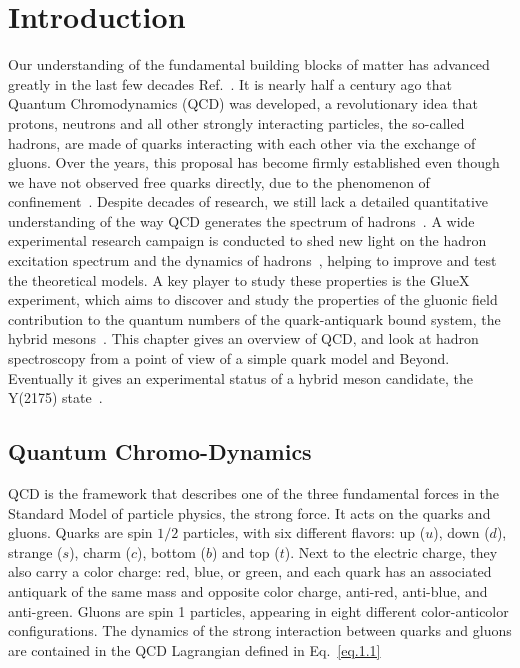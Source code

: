 \chapter{Introduction}
\label{p.1}

Our understanding of the fundamental building blocks of matter has advanced greatly in the last few decades Ref.~\cite{Fritzsch94,Gell64,Gell62,Neeman61,Zweig64}. It is nearly half a century ago that Quantum Chromodynamics (QCD) was developed, a revolutionary idea that protons, neutrons and all other strongly interacting particles, the so-called hadrons, are made of quarks interacting with each other via the exchange of gluons. Over the years, this proposal has become firmly established even though we have not observed free quarks directly, due to the phenomenon of confinement~\cite{Gross05}. Despite decades of research, we still lack a detailed quantitative understanding of the way QCD generates the spectrum of hadrons~\cite{Wilczek05}. A wide experimental research campaign is conducted to shed new light on the hadron excitation spectrum and the dynamics of hadrons~\cite{Tanabashi18}, helping to improve and test the theoretical models. A key player to study these properties is the GlueX experiment, which aims to discover and study the properties of the gluonic field contribution to the quantum numbers of the quark-antiquark bound system, the hybrid mesons~\cite{Meyer18}. This chapter gives an overview of QCD, and look at hadron spectroscopy from a point of view of a simple quark model and Beyond. Eventually it gives an experimental status of a hybrid meson candidate, the Y(2175) state~\cite{Gui07}.

\section{Quantum Chromo-Dynamics}
\label{p.1.1}

QCD is the framework that describes one of the three fundamental forces in the Standard Model of particle physics, the strong force. It acts on the quarks and gluons. Quarks are spin $1/2$ particles, with six different flavors: up ($u$), down ($d$), strange ($s$), charm ($c$), bottom ($b$) and top ($t$). Next to the electric charge, they also carry a color charge: red, blue, or green, and each quark has an associated antiquark of the same mass and opposite color charge, anti-red, anti-blue, and anti-green. Gluons are spin 1 particles, appearing in eight different color-anticolor configurations. The dynamics of the strong interaction between quarks and gluons are contained in the QCD Lagrangian defined in Eq.~\ref{eq.1.1}

